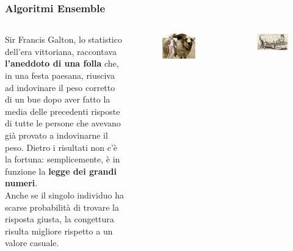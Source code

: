 \begin{frame}
	
	\frametitle{Algoritmi Ensemble}
	
	
	\begin{columns}
		Sir Francis Galton, lo statistico dell'era vittoriana, raccontava \textbf{l'aneddoto di una folla} che, in una festa paesana, riusciva ad indovinare il peso corretto di un bue dopo aver fatto la media delle precedenti risposte di tutte le persone che avevano già provato a indovinarne il peso.
		\newlinedouble
		Dietro i risultati non c'è la fortuna: semplicemente, è in funzione la \textbf{legge dei grandi numeri}.\\
		Anche se il singolo individuo ha scarse probabilità di trovare la risposta giusta, la congettura risulta migliore rispetto a un valore casuale.
		
		\begin{figure}[!htbp]
			\centering
			\includegraphics[width=0.9\linewidth]{images/supervised/z_algorithms_ensemble/weight_guessing_competition_1.jpg}
		\end{figure}
		
		\begin{figure}[!htbp]
			\centering
			\includegraphics[width=0.9\linewidth]{images/supervised/z_algorithms_ensemble/weight_guessing_competition_2.jpg}
		\end{figure}
	\end{columns}


\end{frame}
